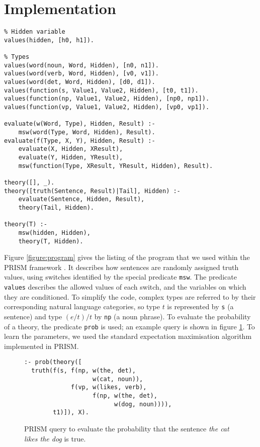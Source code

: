 \documentclass[letterpaper]{article}
\begin{document}
\section{Implementation}

\begin{figure*}
\centering
\begin{lstlisting}
% Hidden variable
values(hidden, [h0, h1]).

% Types
values(word(noun, Word, Hidden), [n0, n1]).
values(word(verb, Word, Hidden), [v0, v1]).
values(word(det, Word, Hidden), [d0, d1]).
values(function(s, Value1, Value2, Hidden), [t0, t1]).
values(function(np, Value1, Value2, Hidden), [np0, np1]).
values(function(vp, Value1, Value2, Hidden), [vp0, vp1]).

evaluate(w(Word, Type), Hidden, Result) :-
	msw(word(Type, Word, Hidden), Result).
evaluate(f(Type, X, Y), Hidden, Result) :-
	evaluate(X, Hidden, XResult),
	evaluate(Y, Hidden, YResult),
	msw(function(Type, XResult, YResult, Hidden), Result).

theory([], _).
theory([truth(Sentence, Result)|Tail], Hidden) :-
	evaluate(Sentence, Hidden, Result),
	theory(Tail, Hidden).

theory(T) :-
	msw(hidden, Hidden),
	theory(T, Hidden).
\end{lstlisting}
\caption{A PRISM program describing probability distributions over
  natural language models used for our examples.}
\label{figure:program}
\end{figure*}

Figure \ref{figure:program} gives the listing of the program that we
used within the PRISM framework \cite{Sato:97}. It describes how
sentences are randomly assigned truth values, using switches
identified by the special predicate \texttt{msw}. The predicate
\texttt{values} describes the allowed values of each switch, and the
variables on which they are conditioned. To simplify the code, complex
types are referred to by their corresponding natural language
categories, so type $t$ is represented by \texttt{s} (a sentence) and
type $(e/t)/t$ by \texttt{np} (a noun phrase). To evaluate the
probability of a theory, the predicate \texttt{prob} is used; an
example query is shown in figure \ref{figure:query}. To learn the
parameters, we used the standard expectation maximisation algorithm
implemented in PRISM.

\begin{figure}
\begin{lstlisting}
:- prob(theory([
  truth(f(s, f(np, w(the, det),
                   w(cat, noun)),
             f(vp, w(likes, verb),
                   f(np, w(the, det),
                         w(dog, noun)))),
        t1)]), X).
\end{lstlisting}
\caption{PRISM query to evaluate the probability that the sentence
  \emph{the cat likes the dog} is true.}
\label{figure:query}
\end{figure}
\end{document}
